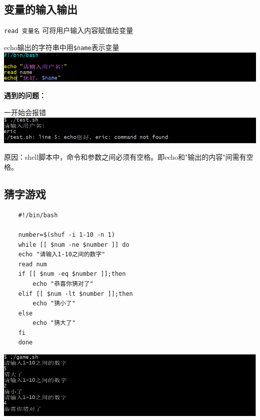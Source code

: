\documentclass[UTF8,a4paper]{ctexart}
\begin{document}
\subsection{变量的输入输出}
\verb|read 变量名| \quad 可将用户输入内容赋值给变量\par
echo输出的字符串中用\verb|$name|表示变量\\
\includegraphics[width=1\textwidth]{./pictures/变量输入输出1.png}\par
\textbf{遇到的问题：}\par
一开始会报错\\
\includegraphics[width=1\textwidth]{./pictures/变量输入输出2.png}\par
原因：shell脚本中，命令和参数之间必须有空格。即echo和"输出的内容"间需有空格。
\subsection{猜字游戏}
\begin{lstlisting}
    #!/bin/bash

    number=$(shuf -i 1-10 -n 1)
    while [[ $num -ne $number ]] do
    echo "请输入1-10之间的数字"
    read num
    if [[ $num -eq $number ]];then
        echo "恭喜你猜对了"
    elif [[ $num -lt $number ]];then
        echo "猜小了"
    else
        echo "猜大了"
    fi
    done

\end{lstlisting}
\includegraphics[width=1\textwidth]{./pictures/game.png}\par
\end{document}
